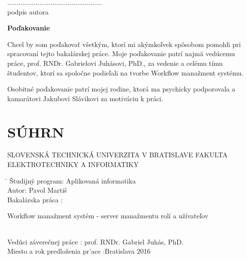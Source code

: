 \documentclass[12pt, oneside]{book}
\def\mfautor{Pavol Martiš}
\begin{document}
\begin{flushright}
	 ..................................................\\
	 \indent podpis autora
\end{flushright}

\vfill

\setcounter{page}{4}
\newpage 
\pagestyle{empty}
\begin{center}
	\LARGE \textbf{Poďakovanie}  \\
\end{center}
\indent Chcel by som poďakovať všetkým, ktorí mi akýmkoľvek spôsobom pomohli pri spracovaní
tejto bakalárskej práce. Moje poďakovanie patrí najmä vedúcemu práce, prof. RNDr. Gabrielovi Juhásovi, PhD., za
vedenie a celému tímu študentov, ktorí sa spoločne podieľali na tvorbe Workflow manažment systému.

\noindent Osobitné poďakovanie patrí mojej rodine, ktorá ma psychicky podporovala a kamarátovi Jakubovi Slávikovi za motiváciu k práci.  
\noindent  

\vfill








\newpage
\pagestyle{empty}	
\section*{\fontsize{22pt}{1.3}\selectfont S\'{U}HRN}
\noindent SLOVENSKÁ TECHNICKÁ UNIVERZITA V BRATISLAVE
\newline
FAKULTA ELEKTROTECHNIKY A INFORMATIKY \\
\begin{tabbing}	
	\hspace*{7cm}\= \kill
	\v{S}tudijný 	program:\> Aplikovaná informatika\\
	Autor:\> \mfautor\\
	Bakalárska práca  :\>
	\begin{minipage}[t]{20em}
		 Workflow manažment systém - server manažmentu rolí a užívateľov
	\end{minipage} \\
	Vedúci záverečnej práce :\> prof. RNDr. Gabriel Juhás, PhD.\\
	
	Miesto a rok predlo\v{z}enia pr\a'ace :\>Bratislava 2016
\end{tabbing}
\end{document}
